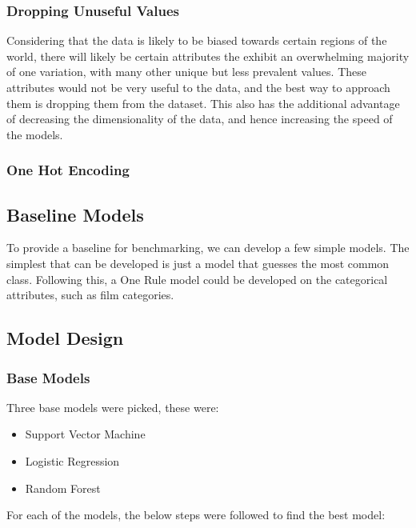 \documentclass[11pt]{article}
\begin{document}
\subsubsection{Dropping Unuseful Values}
Considering that the data is likely to be biased towards certain regions of the world, there will likely be certain attributes the exhibit an overwhelming majority of one variation, with many other unique but less prevalent values. These attributes would not be very useful to the data, and the best way to approach them is dropping them from the dataset. This also has the additional advantage of decreasing the dimensionality of the data, and hence increasing the speed of the models.

\subsubsection{One Hot Encoding}

\subsection{Baseline Models}
To provide a baseline for benchmarking, we can develop a few simple models. The simplest that can be developed is just a model that guesses the most common class. Following this, a One Rule model could be developed on the categorical attributes, such as film categories.

\subsection{Model Design}
\subsubsection{Base Models}

Three base models were picked, these were:

\begin{itemize}
    \item Support Vector Machine
    \item Logistic Regression
    \item Random Forest
\end{itemize}

For each of the models, the below steps were followed to find the best model:
\end{document}
